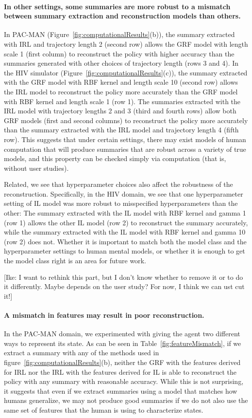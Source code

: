 \documentclass{article}
\begin{document}
\paragraph{In other settings, some summaries are more robust to a mismatch between summary extraction and reconstruction models than others.} In PAC-MAN (Figure~\ref{fig:computationalResults}(b)), the summary extracted with IRL and trajectory length 2 (second row) allows the GRF model with length scale 1 (first column) to reconstruct the policy with higher accuracy than the summaries generated with other choices of trajectory length (rows 3 and 4). In the HIV simulator (Figure~\ref{fig:computationalResults}(c)), the summary extracted with the GRF model with RBF kernel and length scale 10 (second row) allows the IRL model to reconstruct the policy more accurately than the GRF model with RBF kernel and length scale 1 (row 1). The summaries extracted with the IRL model with trajectory lengths 2 and 3 (third and fourth rows) allow both GRF models (first and second columns) to reconstruct the policy more accurately than the summary extracted with the IRL model and trajectory length 4 (fifth row). This suggests that under certain settings, there may exist models of human computation that will produce summaries that are robust across a variety of true models, and this property can be checked simply via computation (that is, without user studies). 

Related, we see that hyperparameter choices also affect the robustness of the reconstruction. Specifically, in the HIV domain, we see that one hyperparameter setting of IL model was more robust to misspecified hyperparameters than the other: The summary extracted with the IL model with RBF kernel and gamma 1 (row 1) allows the other IL model (row 2) to reconstruct the summary accurately, while the summary extracted with the IL model with RBF kernel and gamma 10 (row 2) does not. Whether it is important to match both the model class and the hyperparameter settings to human mental models, or whether it is enough to get the model class right is an area for future work. 

[Ike: I want to rethink this part, but I don't know whether to remove it or to do it differently.  Maybe depends on the user study?  For now, I think we can ust cut it!]

\paragraph{A mismatch in features may result in poor reconstruction.} In the PAC-MAN domain, we experimented with giving the agent two different ways to represent its state. As can be seen in Table~\ref{fig:featureMismatch}, if we extract a summary with any of the methods used in figure~\ref{fig:computationalResults}(b), neither the GRF with the features derived for IRL nor the IRL with the features derived for IL is able to reconstruct the policy with any summary with reasonable accuracy. While this is not surprising, it suggests that even if we extract summaries using a model that matches how humans generalize, we may not produce good summaries if we do not also use the same set of features that the human is using to characterize states.
\end{document}
